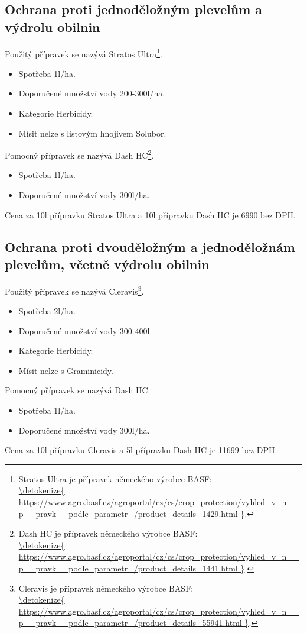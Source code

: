 \subsection{Ochrana proti jednoděložným plevelům a výdrolu obilnin}
Použitý přípravek se nazývá Stratos Ultra\footnote{Stratos Ultra je přípravek německého výrobce BASF: \\\url{\detokenize{
https://www.agro.basf.cz/agroportal/cz/cs/crop_protection/vyhled_v_n__p__pravk__podle_parametr_/product_details_1429.html
}}.}.
\begin{itemize}
  \item Spotřeba 1l/ha.
  \item Doporučené množství vody 200-300l/ha.
  \item Kategorie Herbicidy.
  \item Mísit nelze s listovým hnojivem Solubor.
\end{itemize}
Pomocný přípravek se nazývá Dash HC\footnote{Dash HC je přípravek německého výrobce BASF: \\\url{\detokenize{
https://www.agro.basf.cz/agroportal/cz/cs/crop_protection/vyhled_v_n__p__pravk__podle_parametr_/product_details_1441.html
}}.}.
\begin{itemize}
  \item Spotřeba 1l/ha.
  \item Doporučené množství vody 300l/ha.
\end{itemize}
Cena za 10l přípravku Stratos Ultra a 10l přípravku Dash HC je 6990 bez DPH.

\subsection{Ochrana proti dvouděložným a jednoděložnám plevelům, včetně výdrolu obilnin}
Použitý přípravek se nazývá Cleravis\footnote{Cleravis je přípravek německého výrobce BASF: \\\url{\detokenize{
https://www.agro.basf.cz/agroportal/cz/cs/crop_protection/vyhled_v_n__p__pravk__podle_parametr_/product_details_55941.html
}}.}.
\begin{itemize}
  \item Spotřeba 2l/ha.
  \item Doporučené množství vody 300-400l.
  \item Kategorie Herbicidy.
  \item Mísit nelze s Graminicidy.
\end{itemize}
Pomocný přípravek se nazývá Dash HC.
\begin{itemize}
  \item Spotřeba 1l/ha.
  \item Doporučené množství vody 300l/ha.
\end{itemize}
Cena za 10l přípravku Cleravis a 5l přípravku Dash HC je 11699 bez DPH.
